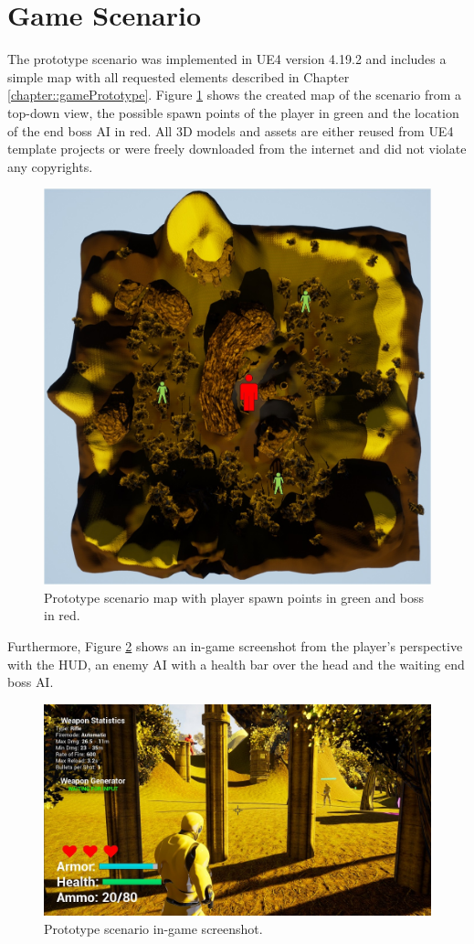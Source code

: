 \documentclass[MGS,Master,english]{twbook}%
\begin{document}
\section{Game Scenario}
The prototype scenario was implemented in \ac{UE4} version 4.19.2 and includes a simple map with all requested elements described in Chapter \ref{chapter::gamePrototype}. Figure \ref{scenarioMap} shows the created map of the scenario from a top-down view, the possible spawn points of the player in green and the location of the end boss \ac{AI} in red. All \ac{3D} models and assets are either reused from \ac{UE4} template projects or were freely downloaded from the internet and did not violate any copyrights.
\begin{figure}[!ht]
	\centering
	\includegraphics[width=0.6\linewidth]{PICs/Prototype/map_with_spawnpoints_and_boss}
	\caption{Prototype scenario map with player spawn points in green and boss in red.} \label{scenarioMap}
\end{figure}

Furthermore, Figure \ref{scenarioScreenshot} shows an in-game screenshot from the player's perspective with the \ac{HUD}, an enemy \ac{AI} with a health bar over the head and the waiting end boss \ac{AI}.
\begin{figure}[!ht]
	\centering
	\includegraphics[width=1.0\linewidth]{PICs/Prototype/ingame_screenshot_small}
	\caption{Prototype scenario in-game screenshot.} \label{scenarioScreenshot}
\end{figure}
\end{document}
